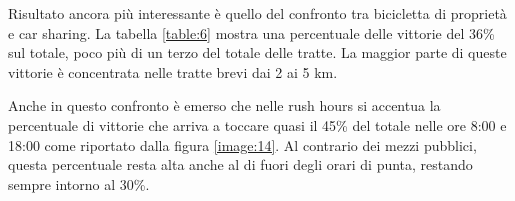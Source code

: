 Risultato ancora più interessante è quello del confronto tra bicicletta di proprietà e car sharing. La tabella \ref{table:6} mostra una percentuale delle vittorie del 36\% sul totale, poco più di un terzo del totale delle tratte. La maggior parte di queste vittorie è concentrata nelle tratte brevi dai 2 ai 5 km.

Anche in questo confronto è emerso che nelle rush hours si accentua la percentuale di vittorie che arriva a toccare quasi il 45\% del totale nelle ore 8:00 e 18:00 come riportato dalla figura \ref{image:14}. Al contrario dei mezzi pubblici, questa percentuale resta alta anche al di fuori degli orari di punta, restando sempre intorno al 30\%.


